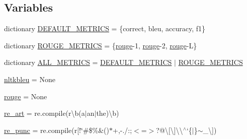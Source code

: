 \subsection*{Variables}
\begin{DoxyCompactItemize}
\item 
dictionary \hyperlink{namespaceparlai_1_1core_1_1metrics_a5cd26a43d8156c993f30c5a707021562}{D\+E\+F\+A\+U\+L\+T\+\_\+\+M\+E\+T\+R\+I\+CS} = \{\textquotesingle{}correct\textquotesingle{}, \textquotesingle{}bleu\textquotesingle{}, \textquotesingle{}accuracy\textquotesingle{}, \textquotesingle{}f1\textquotesingle{}\}
\item 
dictionary \hyperlink{namespaceparlai_1_1core_1_1metrics_ac01c4a05e91baee81e771e8f7ae9e7e4}{R\+O\+U\+G\+E\+\_\+\+M\+E\+T\+R\+I\+CS} = \{\textquotesingle{}\hyperlink{namespaceparlai_1_1core_1_1metrics_ae0fddd2325f5dc52b2a367e52056242a}{rouge}-\/1\textquotesingle{}, \textquotesingle{}\hyperlink{namespaceparlai_1_1core_1_1metrics_ae0fddd2325f5dc52b2a367e52056242a}{rouge}-\/2\textquotesingle{}, \textquotesingle{}\hyperlink{namespaceparlai_1_1core_1_1metrics_ae0fddd2325f5dc52b2a367e52056242a}{rouge}-\/L\textquotesingle{}\}
\item 
dictionary \hyperlink{namespaceparlai_1_1core_1_1metrics_add79f9806fe8f3343a620c790eb98be7}{A\+L\+L\+\_\+\+M\+E\+T\+R\+I\+CS} = \hyperlink{namespaceparlai_1_1core_1_1metrics_a5cd26a43d8156c993f30c5a707021562}{D\+E\+F\+A\+U\+L\+T\+\_\+\+M\+E\+T\+R\+I\+CS} $\vert$ \hyperlink{namespaceparlai_1_1core_1_1metrics_ac01c4a05e91baee81e771e8f7ae9e7e4}{R\+O\+U\+G\+E\+\_\+\+M\+E\+T\+R\+I\+CS}
\item 
\hyperlink{namespaceparlai_1_1core_1_1metrics_aae1295106c31b93af8fbe0da66ebe000}{nltkbleu} = None
\item 
\hyperlink{namespaceparlai_1_1core_1_1metrics_ae0fddd2325f5dc52b2a367e52056242a}{rouge} = None
\item 
\hyperlink{namespaceparlai_1_1core_1_1metrics_a037f8e3330e87d9de75fac930eac7fc2}{re\+\_\+art} = re.\+compile(r\textquotesingle{}\textbackslash{}b(a$\vert$an$\vert$the)\textbackslash{}b\textquotesingle{})
\item 
\hyperlink{namespaceparlai_1_1core_1_1metrics_a334cb58cda231eb62dea1fd375f8d687}{re\+\_\+punc} = re.\+compile(r\textquotesingle{}\mbox{[}!\char`\"{}\#\$\%\&()$\ast$+,-\/./\+:;$<$=$>$?@\textbackslash{}\mbox{[}\textbackslash{}\mbox{]}\textbackslash{}\textbackslash{}$^\wedge$`\{$\vert$\}$\sim$\+\_\+\textbackslash{}\textquotesingle{}\mbox{]}\textquotesingle{})
\end{DoxyCompactItemize}


